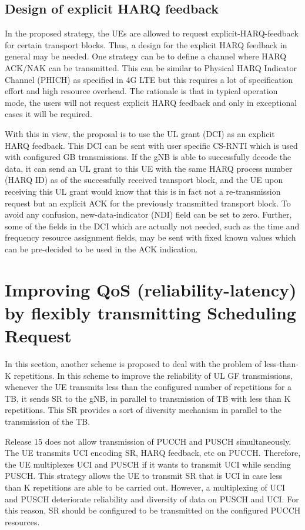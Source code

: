 \documentclass[conference]{IEEEtran}
\begin{document}
\subsection{Design of explicit HARQ feedback}\label{IIBB}

In the proposed strategy, the UEs are allowed to request explicit-HARQ-feedback for certain transport blocks. Thus, a design for the explicit HARQ feedback in general may be needed. One strategy can be to define a channel where HARQ ACK/NAK can be transmitted. This can be similar to Physical HARQ Indicator Channel (PHICH) as specified in 4G LTE but this requires a lot of specification effort and high resource overhead. The rationale is that in typical operation mode, the users will not request explicit HARQ feedback and only in exceptional cases it will be required. 

With this in view, the proposal is to use the UL grant (DCI) as an explicit HARQ feedback. This DCI can be sent with user specific CS-RNTI which is used with configured GB transmissions. If the gNB is able to successfully decode the data, it can send an UL grant to this UE with the same HARQ process number (HARQ ID) as of the successfully received transport block, and the UE upon receiving this UL grant would know that this is in fact not a re-transmission request but an explicit ACK for the previously transmitted transport block. To avoid any confusion, new-data-indicator (NDI) field can be set to zero. Further, some of the fields in the DCI which are actually not needed, such as the time and frequency resource assignment fields, may be sent with fixed known values which can be pre-decided to be used in the ACK indication.

\section{Improving QoS (reliability-latency) by flexibly transmitting Scheduling Request }\label{III}

In this section, another scheme is proposed to deal with the problem of less-than-K repetitions. In this scheme to improve the reliability of UL GF transmissions, whenever the UE transmits less than the configured number of repetitions for a TB, it sends SR to the gNB, in parallel to transmission of TB with less than K repetitions.  This SR provides a sort of diversity mechanism in parallel to the transmission of the TB.

Release 15 does not allow transmission of PUCCH and PUSCH simultaneously. The UE transmits UCI encoding SR, HARQ feedback, etc on PUCCH. Therefore, the UE multiplexes UCI and PUSCH if it wants to transmit UCI while sending PUSCH. This strategy allows the UE to transmit SR that is UCI in case less than K repetitions are able to be carried out. However, a multiplexing of UCI and PUSCH deteriorate reliability and diversity of data on PUSCH and UCI. For this reason, SR should be configured to be transmitted on the configured PUCCH resources.
\end{document}
